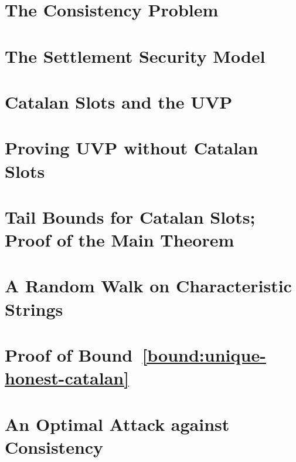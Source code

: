 




\chapter{The Consistency Problem}\label{ch:intro-multihonest}


\chapter{The Settlement Security Model}\label{sec:model-multihonest}


\chapter{Catalan Slots and the UVP}\label{sec:catalan}\label{sec:definitions-multihonest}





\chapter{Proving UVP without Catalan Slots}\label{sec:fork-framework}



\chapter{Tail Bounds for Catalan Slots; Proof of the Main Theorem}\label{sec:bounds-main-proofs-multihonest}


\chapter{A Random Walk on Characteristic Strings}\label{sec:rand-walks}
 


\chapter[Proving the Tail Bound]{Proof of \texorpdfstring{Bound~\ref{bound:unique-honest-catalan}}{the First Tail Bound} }\label{sec:estimates-multihonest}



\chapter{An Optimal Attack against Consistency}\label{sec:opt-adversary}



